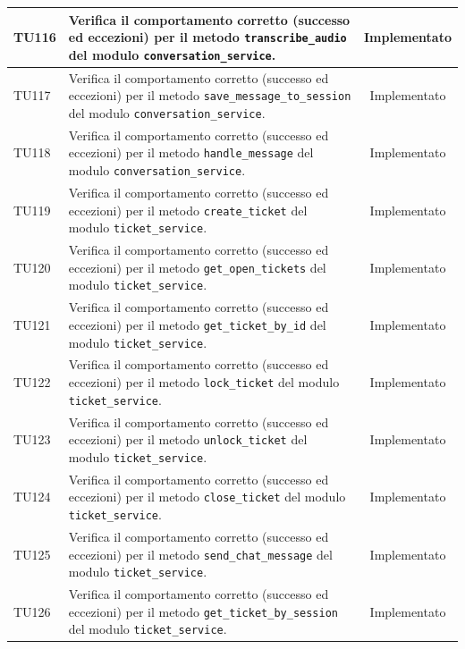 \documentclass[a4paper,11pt,oneside]{scrartcl}
\begin{document}
\begin{longtable}{|p{1.9cm}|p{11.6cm}|c|}
    TU116           & Verifica il comportamento corretto (successo ed eccezioni) per il metodo \texttt{transcribe\_audio} del modulo \texttt{conversation\_service}.               & Implementato   \\ \hline
    TU117           & Verifica il comportamento corretto (successo ed eccezioni) per il metodo \texttt{save\_message\_to\_session} del modulo \texttt{conversation\_service}.      & Implementato   \\ \hline
    TU118           & Verifica il comportamento corretto (successo ed eccezioni) per il metodo \texttt{handle\_message} del modulo \texttt{conversation\_service}.                 & Implementato   \\ \hline
    TU119           & Verifica il comportamento corretto (successo ed eccezioni) per il metodo \texttt{create\_ticket} del modulo \texttt{ticket\_service}.                        & Implementato   \\ \hline
    TU120           & Verifica il comportamento corretto (successo ed eccezioni) per il metodo \texttt{get\_open\_tickets} del modulo \texttt{ticket\_service}.                    & Implementato   \\ \hline
    TU121           & Verifica il comportamento corretto (successo ed eccezioni) per il metodo \texttt{get\_ticket\_by\_id} del modulo \texttt{ticket\_service}.                   & Implementato   \\ \hline
    TU122           & Verifica il comportamento corretto (successo ed eccezioni) per il metodo \texttt{lock\_ticket} del modulo \texttt{ticket\_service}.                          & Implementato   \\ \hline
    TU123           & Verifica il comportamento corretto (successo ed eccezioni) per il metodo \texttt{unlock\_ticket} del modulo \texttt{ticket\_service}.                        & Implementato   \\ \hline
    TU124           & Verifica il comportamento corretto (successo ed eccezioni) per il metodo \texttt{close\_ticket} del modulo \texttt{ticket\_service}.                         & Implementato   \\ \hline
    TU125           & Verifica il comportamento corretto (successo ed eccezioni) per il metodo \texttt{send\_chat\_message} del modulo \texttt{ticket\_service}.                   & Implementato   \\ \hline
    TU126           & Verifica il comportamento corretto (successo ed eccezioni) per il metodo \texttt{get\_ticket\_by\_session} del modulo \texttt{ticket\_service}.              & Implementato   \\ \hline

\end{longtable}
\end{document}
